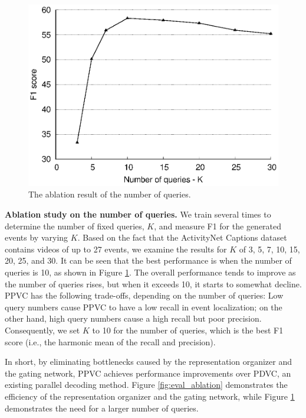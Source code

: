 \begin{figure}[t]
  \centering
   \includegraphics[width=0.9\linewidth]{figures/ppvc_fig5}
   \caption{
    The ablation result of the number of queries.
   }
   \label{fig:eval_ablation_num_query}
\end{figure}



\textbf{Ablation study on the number of queries.}
We train several times to determine the number of fixed queries, $K$, and measure F1 for the generated events by varying $K$.
Based on the fact that the ActivityNet Captions dataset contains videos of up to 27 events, we examine the results for $K$ of 3, 5, 7, 10, 15, 20, 25, and 30.
It can be seen that the best performance is when the number of queries is 10, as shown in Figure \ref{fig:eval_ablation_num_query}.
The overall performance tends to improve as the number of queries rises, but when it exceeds 10, it starts to somewhat decline.
PPVC has the following trade-offs, depending on the number of queries: Low query numbers cause PPVC to have a low recall in event localization; on the other hand, high query numbers cause a high recall but poor precision.
Consequently, we set $K$ to 10 for the number of queries, which is the best F1 score (i.e., the harmonic mean of the recall and precision).

In short, by eliminating bottlenecks caused by the representation organizer and the gating network, PPVC achieves performance improvements over PDVC, an existing parallel decoding method.
Figure \ref{fig:eval_ablation} demonstrates the efficiency of the representation organizer and the gating network, while Figure \ref{fig:eval_ablation_num_query} demonstrates the need for a larger number of queries.

